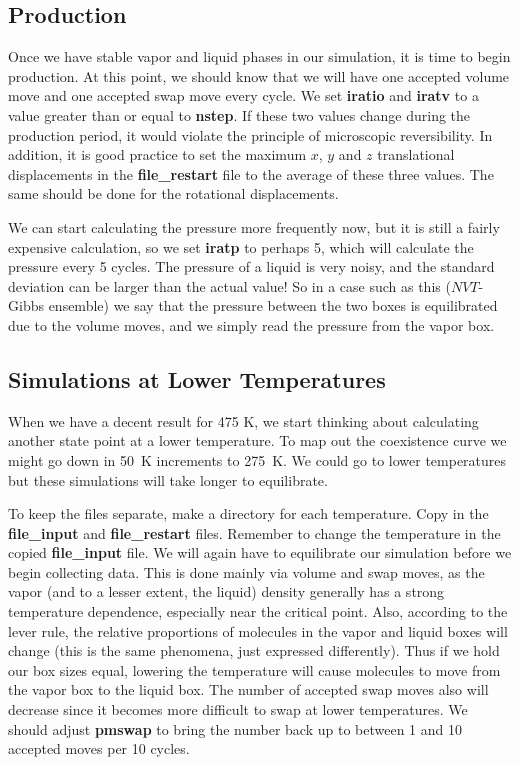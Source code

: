 \documentclass[12pt,letterpaper]{article}
\begin{document}
\subsection{Production}
Once we have stable vapor and liquid phases in our
simulation, it is time to begin production. At this point,
we should know that we will have one accepted volume move
and one accepted swap move every cycle. We set {\bf
  iratio} and {\bf iratv} to a value greater than or equal
to {\bf nstep}. If these two values change during the
production period, it would violate the principle of
microscopic reversibility. In addition, it is good practice
to set the maximum $x$, $y$ and $z$ translational
displacements in the {\bf file\_restart} file to the average
of these three values. The same should be done for the
rotational displacements.

We can start calculating the pressure more frequently now,
but it is still a fairly expensive calculation, so we set
{\bf iratp} to perhaps 5, which will calculate the pressure
every 5 cycles. The pressure of a liquid is very noisy, and
the standard deviation can be larger than the actual value!
So in a case such as this ($NVT$-Gibbs ensemble) we say that
the pressure between the two boxes is equilibrated due to
the volume moves, and we simply read the pressure from the
vapor box.

\subsection{Simulations at Lower Temperatures}
When we have a decent result for 475 K, we start thinking
about calculating another state point at a lower
temperature. To map out the coexistence curve we might go
down in 50~K increments to 275~K. We could go to lower
temperatures but these simulations will take longer to
equilibrate.

To keep the files separate, make a directory for each
temperature. Copy in the {\bf file\_input} and {\bf
  file\_restart} files. Remember to change the temperature
in the copied {\bf file\_input} file. We will again have to
equilibrate our simulation before we begin collecting data.
This is done mainly via volume and swap moves, as the vapor
(and to a lesser extent, the liquid) density generally has a
strong temperature dependence, especially near the critical
point. Also, according to the lever rule, the relative
proportions of molecules in the vapor and liquid boxes will
change (this is the same phenomena, just expressed
differently). Thus if we hold our box sizes equal, lowering
the temperature will cause molecules to move from the vapor
box to the liquid box. The number of accepted swap moves
also will decrease since it becomes more difficult to swap
at lower temperatures. We should adjust {\bf pmswap} to
bring the number back up to between 1 and 10 accepted moves per 10 cycles.
\end{document}
